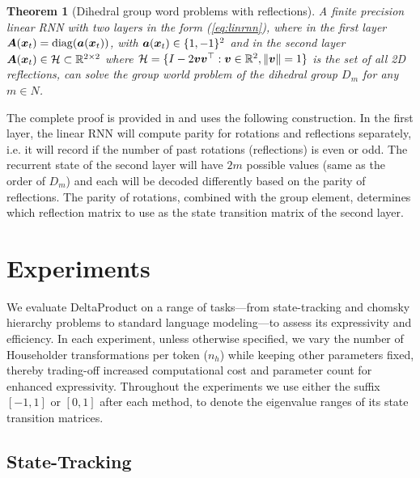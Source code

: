 \documentclass{article} %
\newtheorem{theorem}{Theorem}
\begin{document}
\begin{theorem}[Dihedral group word problems with reflections]\label{thm:dihedral} A finite precision linear RNN with two layers in the form (\ref{eq:linrnn}), where in the first layer ${\bm{A}}({\bm{x}}_t) = \mathrm{diag}({\bm{a}}({\bm{x}}_t))$, with ${\bm{a}}({\bm{x}}_t) \in \{1,-1\}^2$ and in the second layer ${\bm{A}}({\bm{x}}_t) \in \mathcal{H} \subset \mathbb{R}^{2 \times 2}$ where $\mathcal{H} = \{I - 2 {\bm{v}}{\bm{v}}^\top : {\bm{v}} \in \mathbb{R}^2, \lVert {\bm{v}} \rVert =1 \}$ is the set of all 2D reflections, can solve the group world problem of the dihedral group $D_m$ for any $m\in N$. 
\end{theorem}
The complete proof is provided in  and uses the following construction. In the first layer, the linear RNN will compute parity for rotations and reflections separately, i.e. it will record if the number of past rotations (reflections) is even or odd. 
The recurrent state of the second layer will have $2m$ possible values (same as the order of $D_m$) and each will be decoded differently based on the parity of reflections. 
The parity of rotations, combined with the group element, determines which reflection matrix to use as the state transition matrix of the second layer.

\vspace{-10pt}
\section{Experiments}\label{sec:experiments}
\vspace{-5pt}
We evaluate DeltaProduct on a range of tasks—from state-tracking and chomsky hierarchy problems to standard language modeling—to assess its expressivity and efficiency. In each experiment, unless otherwise specified, we vary the number of Householder transformations per token ($n_h$) while keeping other parameters fixed, thereby trading-off increased computational cost and parameter count for enhanced expressivity. Throughout the experiments we use either the suffix $[-1,1]$ or $[0,1]$ after each method, to denote the eigenvalue ranges of its state transition matrices.
\vspace{-5pt}
\subsection{State-Tracking}\label{sec:state-tracking}
\end{document}
